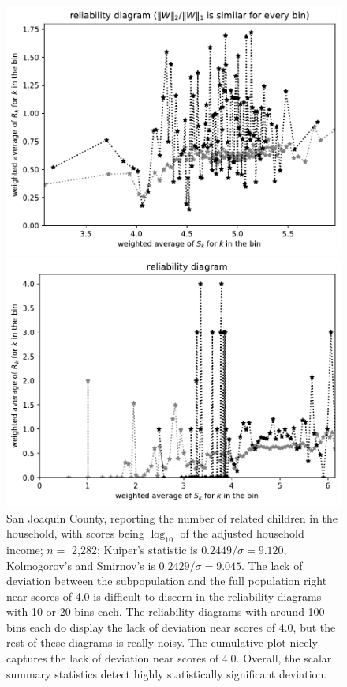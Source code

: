 \documentclass{article}
\begin{document}
\begin{figure}
\begin{centering}
\parbox{\imsize}{\includegraphics[width=\imsize]
{./codes/weighted/County_of_San_Joaquin-NRC/equierrs100}}
\quad\quad
\parbox{\imsize}{\includegraphics[width=\imsize]
{./codes/weighted/County_of_San_Joaquin-NRC/equiscores100}}

\end{centering}
\caption{San Joaquin County, reporting the number of related children
         in the household, with scores being $\log_{10}$
         of the adjusted household income;
         $n =$ 2,282; Kuiper's statistic is $0.2449 / \sigma = 9.120$,
         Kolmogorov's and Smirnov's is $0.2429 / \sigma = 9.045$.
The lack of deviation between the subpopulation
and the full population right near scores of 4.0 is difficult to discern
in the reliability diagrams with 10 or 20 bins each. The reliability diagrams
with around 100 bins each do display the lack of deviation near scores of 4.0,
but the rest of these diagrams is really noisy.
The cumulative plot nicely captures the lack of deviation near scores of 4.0.
Overall, the scalar summary statistics detect
highly statistically significant deviation.
}
\label{san_joaquin}
\end{figure}
\end{document}
